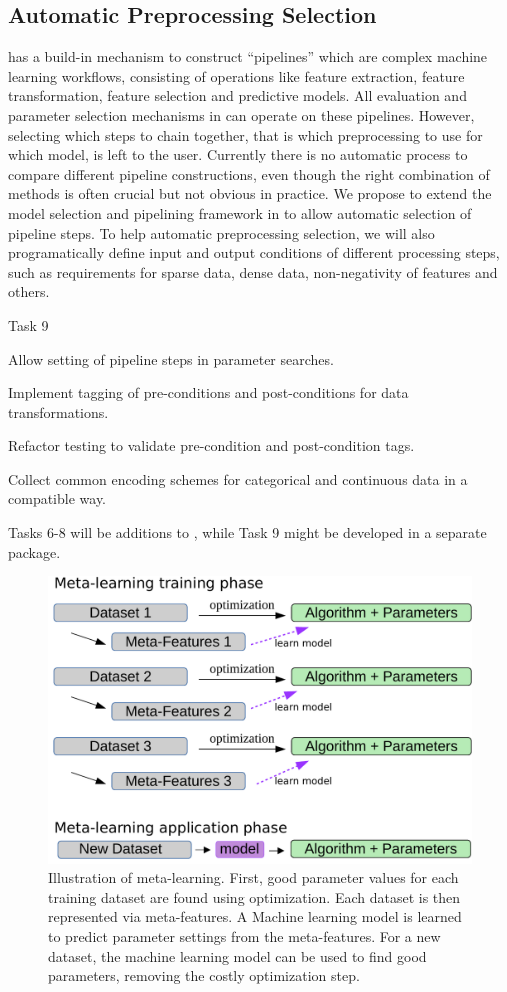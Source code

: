\subsection{Automatic Preprocessing Selection}
\sklearn{} has a build-in mechanism to construct ``pipelines'' which are complex 
machine learning workflows, consisting of operations like feature extraction,
feature transformation, feature selection and predictive models.
All evaluation and parameter selection mechanisms in \sklearn{} can operate
on these pipelines.
However, selecting which steps to chain together, that is which preprocessing
to use for which model, is left to the user. Currently there is no
automatic process to compare different pipeline constructions, even though
the right combination of methods is often crucial but not obvious in practice.
We propose to extend the model selection and pipelining framework in \sklearn{}
to allow automatic selection of pipeline steps.
To help automatic preprocessing selection, we will also programatically
define input and output conditions of different processing steps, such
as requirements for sparse data, dense data, non-negativity of features and others.
\begin{labeling}{Task 9}
    \item [Task 6] Allow setting of pipeline steps in \sklearn{} parameter searches.
    \item [Task 7] Implement tagging of pre-conditions and post-conditions for data transformations.
    \item [Task 8] Refactor \sklearn{} testing to validate pre-condition and post-condition tags.
    \item [Task 9] Collect common encoding schemes for categorical and
        continuous data in a \sklearn{} compatible way.
\end{labeling}
Tasks 6-8 will be additions to \sklearn{}, while Task 9 might be developed in a separate package.

\begin{figure}
    \centering
    \includegraphics[width=.6\linewidth]{meta-learning-diagram.pdf}
    \caption{Illustration of meta-learning. First, good parameter values for
        each training dataset are found using optimization. Each dataset is
        then represented via meta-features. A Machine learning model is learned
        to predict parameter settings from the meta-features. For a new
        dataset, the machine learning model can be used to find good
    parameters, removing the costly optimization step.}
    \label{meta-learning}
\end{figure}

